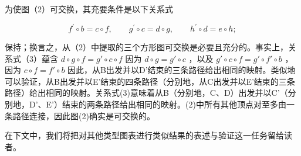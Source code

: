 为使图（2）可交换，其充要条件是以下关系式

\[
f ^ {\prime} \circ b = c \circ f, \qquad g ^ {\prime} \circ c = d \circ g, \qquad h ^ {\prime} \circ d = e \circ h;\tag{3}
\]

保持；换言之，从（2）中提取的三个方形图可交换是必要且充分的。事实上，关系式（3）蕴含 \(d \circ g \circ f = g' \circ c \circ f\) 因为 \(d \circ g = g' \circ c\) ，以及 \(g' \circ c \circ f = g' \circ f' \circ b\) ，因为 \(c \circ f = f' \circ b\) 因此，从B出发并以D'结束的三条路径给出相同的映射。类似地可以验证，从B出发并以E'结束的四条路径（分别地，从C出发并以E'结束的三条路径）给出相同的映射。关系式(3)意味着从B（分别地，C、D）出发并以C'（分别地，D'、E'）结束的两条路径给出相同的映射。(2)中所有其他顶点对至多由一条路径连接，因此图(2)确实是可交换的。

在下文中，我们将把对其他类型图表进行类似结果的表述与验证这一任务留给读者。

